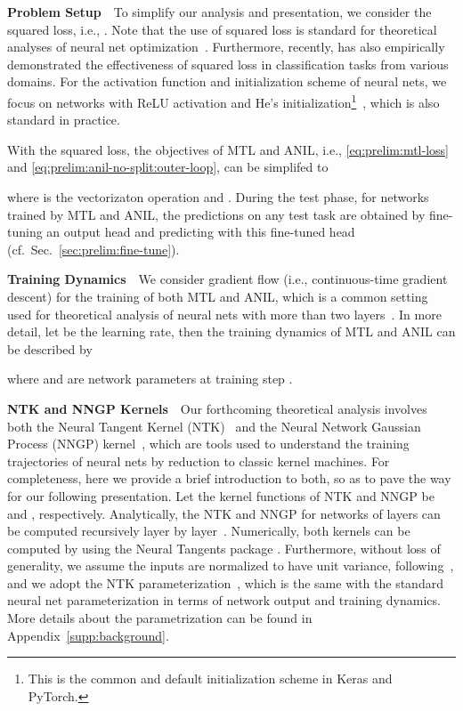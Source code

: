 \documentclass{article}
\begin{document}
\textbf{Problem Setup}~~To simplify our analysis and presentation, we consider the squared loss, i.e., . Note that the use of squared loss is standard for theoretical analyses of neural net optimization~\cite{ntk,du2019icml,AllenZhu2018ACT}. Furthermore, recently, \citet{hui2020evaluation} has also empirically demonstrated the effectiveness of squared loss in classification tasks from various domains. For the activation function and initialization scheme of neural nets, we focus on networks with ReLU activation and He's initialization\footnote{This is the common and default initialization scheme in Keras and PyTorch.}~\cite{resnet}, which is also standard in practice.

With the squared loss, the objectives of MTL and ANIL, i.e., \eqref{eq:prelim:mtl-loss} and \eqref{eq:prelim:anil-no-split:outer-loop}, can be simplifed to 

where  is the vectorizaton operation and . During the test phase, for networks trained by MTL and ANIL, the predictions on any test task are obtained by fine-tuning an output head and predicting with this fine-tuned head (cf.\ Sec.~\ref{sec:prelim:fine-tune}). 

\textbf{Training Dynamics}~~We consider gradient flow (i.e., continuous-time gradient descent) for the training of both MTL and ANIL, which is a common setting used for theoretical analysis of neural nets with more than two layers~\citep{ntk,lee2019wide,CNTK}. In more detail, let  be the learning rate, then the training dynamics of MTL and ANIL can be described by

where  and  are network parameters at training step .

\textbf{NTK and NNGP Kernels}~~Our forthcoming theoretical analysis involves both the Neural Tangent Kernel (NTK)~\cite{ntk,du2019icml,AllenZhu2018ACT} and the Neural Network Gaussian Process (NNGP) kernel~\citep{lee2018deep,novak2019bayesian}, which are tools used to understand the training trajectories of neural nets by reduction to classic kernel machines. For completeness, here we provide a brief introduction to both, so as to pave the way for our following presentation. Let the kernel functions of NTK and NNGP be  and , respectively. Analytically, the NTK and NNGP for networks of  layers can be computed recursively layer by layer~\citep{lee2019wide,CNTK}. Numerically, both kernels can be computed by using the Neural Tangents package \cite{neuraltangents2020}. Furthermore, without loss of generality, we assume the inputs are normalized to have unit variance, following~\citep{xiao2020dis}, and we adopt the NTK parameterization~\citep{lee2019wide}, which is the same with the standard neural net parameterization in terms of network output and training dynamics. More details about the parametrization can be found in Appendix~\ref{supp:background}.
\end{document}

